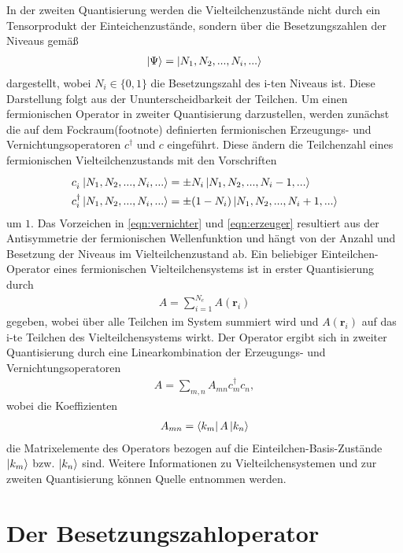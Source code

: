 In der zweiten Quantisierung werden die Vielteilchenzustände nicht durch ein Tensorprodukt der Einteichenzustände, sondern über die Besetzungszahlen der Niveaus gemäß
\begin{align}
  \ket{\Psi} = \ket{N_1,N_2,...,N_i,...}
\end{align}
dargestellt, wobei $N_i \in \{ 0,1 \}$ die Besetzungszahl des i-ten Niveaus ist. Diese Darstellung folgt aus der Ununterscheidbarkeit der Teilchen.
Um einen fermionischen Operator in zweiter Quantisierung darzustellen, werden zunächst die auf dem Fockraum(footnote) definierten fermionischen Erzeugungs- und Vernichtungsoperatoren $c^\dag$ und $c$ eingeführt.
Diese ändern die Teilchenzahl eines fermionischen Vielteilchenzustands mit den Vorschriften
\begin{align}
  c_i^{\phantom{\dag}} \ket{N_1,N_2,...,N_i,...} & = \pm N_i \ket{N_1,N_2,...,N_i-1,...} \label{eqn:vernichter}\\
  c_i^\dag \ket{N_1,N_2,..., N_i,...} & = \pm (1-N_i) \ket{N_1,N_2,...,N_i+1,...} \label{eqn:erzeuger}
\end{align}
um $1$. Das Vorzeichen in \eqref{eqn:vernichter} und \eqref{eqn:erzeuger} resultiert aus der Antisymmetrie der fermionischen Wellenfunktion und hängt von der Anzahl und Besetzung der Niveaus im Vielteilchenzustand ab.
Ein beliebiger Einteilchen-Operator eines fermionischen Vielteilchensystems ist in erster Quantisierung durch
\begin{align}
  A = \sum_{i=1}^{N_e} A(\symbf{r}_i)
\end{align}
gegeben, wobei über alle Teilchen im System summiert wird und $A(\symbf{r}_i)$ auf das i-te Teilchen des Vielteilchensystems wirkt.
Der Operator ergibt sich in zweiter Quantisierung durch eine Linearkombination der Erzeugungs- und Vernichtungsoperatoren
\begin{align}
  A = \sum_{m,n} A_{mn} c_m^\dag c_n^{\phantom{\dag}},
\end{align}
wobei die Koeffizienten
\begin{align}
  A_{mn} = \bra{k_m} A \ket{k_n}
  \label{eqn:matrixelemente}
\end{align}
die Matrixelemente des Operators bezogen auf die Einteilchen-Basis-Zustände $\ket{k_m}$ bzw. $\ket{k_n}$ sind.
Weitere Informationen zu Vielteilchensystemen und zur zweiten Quantisierung können Quelle \cite{cy} entnommen werden.

\section{Der Besetzungszahloperator}

